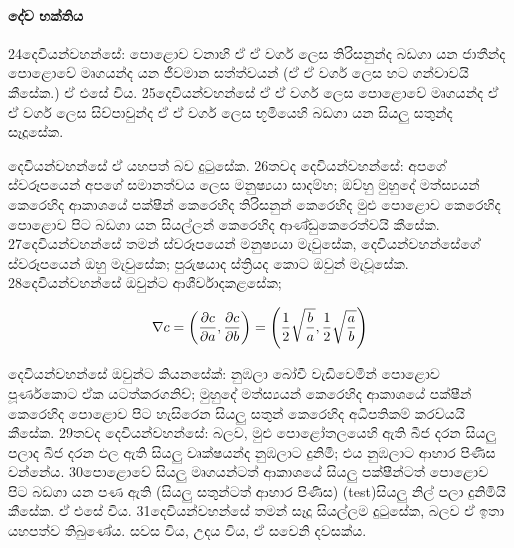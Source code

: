 \documentclass[10pt]{book}
\begin{document}
\paragraph{දේව භක්තිය} 
  \textsf{24දෙවියන්වහන්සේ: පොළොව වනාහි ඒ ඒ වර්ග ලෙස තිරිසනුන්ද බඩගා යන ජාතීන්ද පොළොවේ මෘගයන්ද යන ජීවමාන සත්ත්වයන් (ඒ ඒ වර්ග ලෙස හට ගන්වාවයි කීසේක.) ඒ එසේ විය. 25දෙවියන්වහන්සේ ඒ ඒ වර්ග ලෙස පොළොවේ මෘගයන්ද ඒ ඒ වර්ග ලෙස සිව්පාවුන්ද ඒ ඒ වර්ග ලෙස භූමියෙහි බඩගා යන සියලු සතුන්ද සෑදූසේක.} \\

\begin{center}
\end{center}
 
දෙවියන්වහන්සේ ඒ යහපත් බව දුටුසේක. 26තවද දෙවියන්වහන්සේ: අපගේ ස්වරූපයෙන් අපගේ සමානත්වය ලෙස මනුෂ්‍යයා සාදම්හ; ඔව්හු මුහුදේ මත්ස්‍යයන් කෙරෙහිද ආකාශයේ පක්ෂීන් කෙරෙහිද තිරිසනුන් කෙරෙහිද මුළු පොළොව කෙරෙහිද පොළොව පිට බඩගා යන සියල්ලන් කෙරෙහිද ආණ්ඩුකෙරෙත්වයි කීසේක. 27දෙවියන්වහන්සේ තමන් ස්වරූපයෙන් මනුෂ්‍යයා මැවුසේක, දෙවියන්වහන්සේගේ ස්වරූපයෙන් ඔහු මැවුසේක; පුරුෂයාද ස්ත්‍රියද කොට ඔවුන් මැවූසේක. 28දෙවියන්වහන්සේ ඔවුන්ට ආශීර්වාදකළසේක;

\begin{equation}
\nabla c=\left({\partial c\over \partial a}, {\partial c\over \partial b}\right)=\left({1\over 2}\sqrt{b\over a},{1\over 2}\sqrt{a\over b}\right)
\end{equation}

 දෙවියන්වහන්සේ ඔවුන්ට කියනසේක්: නුඹලා බෝවී වැඩිවෙමින් පොළොව පූර්ණකොට ඒක යටත්කරගනිව්; මුහුදේ මත්ස්‍යයන් කෙරෙහිද ආකාශයේ පක්ෂීන් කෙරෙහිද පොළොව පිට හැසිරෙන සියලු සතුන් කෙරෙහිද අධිපතිකම් කරව්යයි කීසේක. 29තවද දෙවියන්වහන්සේ: බලව, මුළු පොළෝතලයෙහි ඇති බීජ දරන සියලු පලාද බීජ දරන ඵල ඇති සියලු වෘක්ෂයන්ද නුඹලාට දුනිමි; එය නුඹලාට ආහාර පිණිස වන්නේය. 30පොළොවේ සියලු මෘගයන්ටත් ආකාශයේ සියලු පක්ෂීන්ටත් පොළොව පිට බඩගා යන පණ ඇති (සියලු සතුන්ටත් ආහාර පිණිස) (test)සියලු නිල් පලා දුනිමියි කීසේක. ඒ එසේ විය. 31දෙවියන්වහන්සේ තමන් සෑදූ සියල්ලම දුටුසේක, බලව ඒ ඉතා යහපත්ව තිබුණේය. සවස විය, උදය විය, ඒ සවෙනි දවසක්ය. 
 
\end{document}
